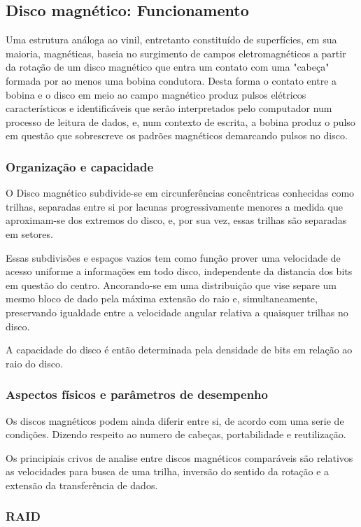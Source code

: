 \documentclass[12pt]{article}
\begin{document}
\subsection{Disco magnético: Funcionamento}
Uma estrutura análoga ao vinil, entretanto constituído de superfícies, em sua maioria, magnéticas, baseia no surgimento de campos eletromagnéticos a partir da rotação de um disco magnético que entra um contato com uma "cabeça" formada por ao menos uma bobina condutora. Desta forma o contato entre a bobina e o disco em meio ao campo magnético produz pulsos elétricos característicos e identificáveis que serão interpretados pelo computador num processo de leitura de dados, e, num contexto de escrita, a bobina produz o pulso em questão que sobrescreve os padrões magnéticos demarcando pulsos no disco.
\subsubsection*{Organização e capacidade}
O Disco magnético subdivide-se em circunferências concêntricas conhecidas como trilhas, separadas entre si por lacunas progressivamente menores a medida que aproximam-se dos extremos do disco, e, por sua vez, essas trilhas são separadas em setores. 

Essas subdivisões e espaços vazios tem como função prover uma velocidade de acesso uniforme a informações em todo disco, independente da distancia dos bits em questão do centro. Ancorando-se em uma distribuição que vise separe um mesmo bloco de dado pela máxima extensão do raio e, simultaneamente, preservando igualdade entre a velocidade angular relativa a quaisquer trilhas no disco.


A capacidade do disco é então determinada pela densidade de bits em relação ao raio do disco.  

\subsubsection*{Aspectos físicos e parâmetros de desempenho}
Os discos magnéticos podem ainda diferir entre si, de acordo com uma serie de condições. Dizendo respeito ao numero de cabeças, portabilidade e reutilização.

Os principiais crivos de analise entre discos magnéticos comparáveis são relativos as velocidades para busca de uma trilha, inversão do sentido da rotação e a extensão da transferência de dados.

\subsubsection*{RAID}
\end{document}
